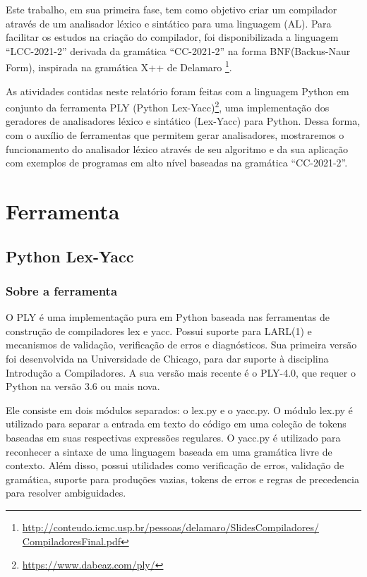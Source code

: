 \documentclass[
	12pt,				%
	openright,			%
	twoside,			%
	a4paper,			%
	english,			%
	french,				%
	spanish,			%
	brazil				%
	]{abntex2}
\begin{document}
Este trabalho, em sua primeira fase, tem como objetivo criar um compilador através de um
analisador léxico e sintático para uma linguagem (AL). Para facilitar os estudos na criação do compilador,
foi disponibilizada a linguagem ``LCC-2021-2'' derivada da gramática ``CC-2021-2''
na forma BNF(Backus-Naur Form), inspirada na gramática X++ de Delamaro
\footnote{\url{http://conteudo.icmc.usp.br/pessoas/delamaro/SlidesCompiladores/
CompiladoresFinal.pdf}}.

As atividades contidas neste relatório foram feitas com a linguagem Python em
conjunto da ferramenta PLY (Python Lex-Yacc)\footnote{\url{https://www.dabeaz.com/ply/}},
uma implementação dos geradores de analisadores léxico e sintático (Lex-Yacc) para Python.
Dessa forma, com o auxílio de ferramentas que permitem gerar analisadores, mostraremos
o funcionamento do analisador léxico através de seu algoritmo e da sua aplicação com 
exemplos de programas em alto nível baseadas na gramática ``CC-2021-2''.




\part{Ferramenta}
\chapter{Python Lex-Yacc}
\section{Sobre a ferramenta}
O PLY é uma implementação pura em Python baseada nas ferramentas de construção
de compiladores lex e yacc. Possui suporte para LARL(1) e mecanismos
de validação, verificação de erros e diagnósticos. Sua primeira versão foi desenvolvida
na Universidade de Chicago, para dar suporte à disciplina Introdução a Compiladores.
A sua versão mais recente é o PLY-4.0, que requer o Python na versão 3.6 ou mais nova. 

Ele consiste em dois módulos separados: o lex.py e o yacc.py. O módulo lex.py é utilizado
para separar a entrada em texto do código em uma coleção de tokens baseadas em suas respectivas 
expressões regulares. O yacc.py é utilizado para reconhecer a sintaxe de uma linguagem 
baseada em uma gramática livre de contexto. Além disso, possui utilidades como verificação
de erros, validação de gramática, suporte para produções vazias, tokens de erros e regras de
precedencia para resolver ambiguidades.
\end{document}

